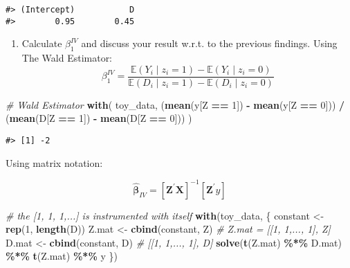 \documentclass[
]{article}
\newenvironment{Shaded}{\begin{snugshade}}{\end{snugshade}}
\newcommand{\CommentTok}[1]{\textcolor[rgb]{0.56,0.35,0.01}{\textit{#1}}}
\newcommand{\DecValTok}[1]{\textcolor[rgb]{0.00,0.00,0.81}{#1}}
\newcommand{\KeywordTok}[1]{\textcolor[rgb]{0.13,0.29,0.53}{\textbf{#1}}}
\newcommand{\NormalTok}[1]{#1}
\newcommand{\OperatorTok}[1]{\textcolor[rgb]{0.81,0.36,0.00}{\textbf{#1}}}
\newcommand{\StringTok}[1]{\textcolor[rgb]{0.31,0.60,0.02}{#1}}
\providecommand{\tightlist}{%
  \setlength{\itemsep}{0pt}\setlength{\parskip}{0pt}}
\begin{document}
\begin{verbatim}
#> (Intercept)           D 
#>        0.95        0.45
\end{verbatim}

\begin{enumerate}
\def\labelenumi{(\alph{enumi})}
\setcounter{enumi}{3}
\tightlist
\item
  Calculate \({\beta}^{IV}_1\) and discuss your result w.r.t. to the
  previous findings. Using The Wald Estimator: \[
  {\beta}^{IV}_1=\frac{\mathbb{E}\left(Y_{i} \mid z_{i}=1\right)-\mathbb{E}\left(Y_{i} \mid z_{i}=0\right)}{\mathbb{E}\left(D_{i} \mid z_{i}=1\right)-\mathbb{E}\left(D_{i} \mid z_{i}=0\right)}
  \]
\end{enumerate}

\begin{Shaded}
\begin{Highlighting}[]
\CommentTok{\# Wald Estimator }
\KeywordTok{with}\NormalTok{(}
\NormalTok{  toy\_data,}
\NormalTok{  (}\KeywordTok{mean}\NormalTok{(y[Z }\OperatorTok{==}\StringTok{ }\DecValTok{1}\NormalTok{]) }\OperatorTok{{-}}\StringTok{ }\KeywordTok{mean}\NormalTok{(y[Z }\OperatorTok{==}\StringTok{ }\DecValTok{0}\NormalTok{])) }\OperatorTok{/}\StringTok{ }\NormalTok{(}\KeywordTok{mean}\NormalTok{(D[Z }\OperatorTok{==}\StringTok{ }\DecValTok{1}\NormalTok{]) }\OperatorTok{{-}}\StringTok{ }\KeywordTok{mean}\NormalTok{(D[Z }\OperatorTok{==}\StringTok{ }\DecValTok{0}\NormalTok{]))}
\NormalTok{)}
\end{Highlighting}
\end{Shaded}

\begin{verbatim}
#> [1] -2
\end{verbatim}

Using matrix notation:

\[
\widehat{\boldsymbol{\beta}}_{I V}=\left[\mathbf{Z^\prime} \mathbf{X}\right]^{-1} [\mathbf{Z^\prime} y]
\]

\begin{Shaded}
\begin{Highlighting}[]
\CommentTok{\# the [1, 1, 1,...]\textquotesingle{} is instrumented with itself}
\KeywordTok{with}\NormalTok{(toy\_data, \{}
\NormalTok{  constant \textless{}{-}}\StringTok{ }\KeywordTok{rep}\NormalTok{(}\DecValTok{1}\NormalTok{, }\KeywordTok{length}\NormalTok{(D))}
\NormalTok{  Z.mat \textless{}{-}}\StringTok{ }\KeywordTok{cbind}\NormalTok{(constant, Z) }\CommentTok{\# Z.mat = [[1, 1,..., 1]\textquotesingle{}, Z]}
\NormalTok{  D.mat \textless{}{-}}\StringTok{ }\KeywordTok{cbind}\NormalTok{(constant, D) }\CommentTok{\# [[1, 1,..., 1]\textquotesingle{}, D]}
  \KeywordTok{solve}\NormalTok{(}\KeywordTok{t}\NormalTok{(Z.mat) }\OperatorTok{\%*\%}\StringTok{ }\NormalTok{D.mat) }\OperatorTok{\%*\%}\StringTok{ }\KeywordTok{t}\NormalTok{(Z.mat) }\OperatorTok{\%*\%}\StringTok{ }\NormalTok{y}
\NormalTok{\})}
\end{Highlighting}
\end{Shaded}
\end{document}
